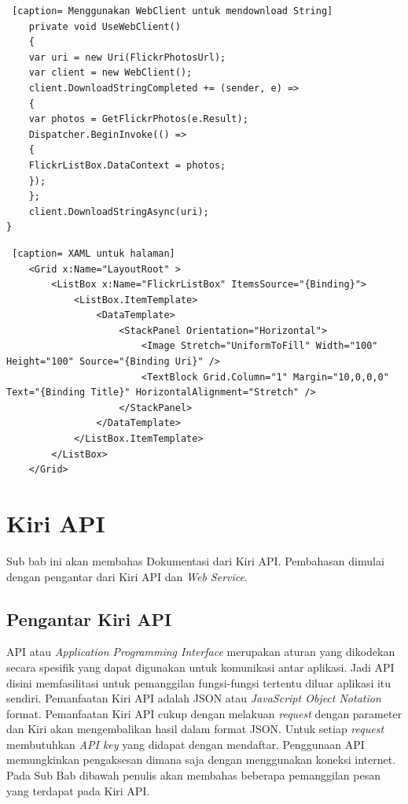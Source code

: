 \begin{lstlisting} [caption= Menggunakan WebClient untuk mendownload String]
	private void UseWebClient()
	{
	var uri = new Uri(FlickrPhotosUrl);
	var client = new WebClient();
	client.DownloadStringCompleted += (sender, e) =>
	{
	var photos = GetFlickrPhotos(e.Result);
	Dispatcher.BeginInvoke(() =>
	{
	FlickrListBox.DataContext = photos;
	});
	};
	client.DownloadStringAsync(uri);
}
\end{lstlisting}

\begin{lstlisting} [caption= XAML untuk halaman]
	<Grid x:Name="LayoutRoot" >
		<ListBox x:Name="FlickrListBox" ItemsSource="{Binding}">
			<ListBox.ItemTemplate>
				<DataTemplate>
					<StackPanel Orientation="Horizontal">
						<Image Stretch="UniformToFill" Width="100" Height="100" Source="{Binding Uri}" />
						<TextBlock Grid.Column="1" Margin="10,0,0,0" Text="{Binding Title}" HorizontalAlignment="Stretch" />
					</StackPanel>
				</DataTemplate>
			</ListBox.ItemTemplate>
		</ListBox>
	</Grid>
\end{lstlisting}

\section{Kiri API}
\label{sec:Kiri API}
\hspace{0.5cm} Sub bab ini akan membahas Dokumentasi dari Kiri API. Pembahasan dimulai dengan pengantar dari Kiri API dan \textit{Web Service}.

\subsection{Pengantar Kiri API}
\label{subsec:Pengantar Kiri API}
\hspace{0.5cm} API atau \textit{Application Programming Interface} merupakan aturan yang dikodekan secara spesifik yang dapat digunakan untuk komunikasi antar aplikasi. Jadi API disini memfasilitasi untuk pemanggilan fungsi-fungsi tertentu diluar aplikasi itu sendiri. Pemanfaatan Kiri API adalah JSON atau \textit{JavaScript Object Notation} format. Pemanfaatan Kiri API cukup dengan melakuan \textit{request} dengan parameter dan Kiri akan mengembalikan hasil dalam format JSON. Untuk setiap \textit{request} membutuhkan \textit{API key} yang didapat dengan mendaftar\footnotemark[2]. Penggunaan API memungkinkan pengaksesan dimana saja dengan menggunakan koneksi internet. Pada Sub Bab dibawah penulis akan membahas beberapa pemanggilan pesan yang terdapat pada Kiri API.

